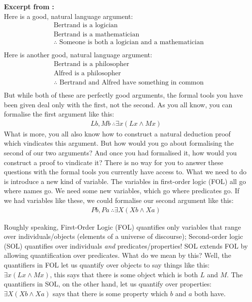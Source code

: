 \begin{tcolorbox}
    \textbf{Excerpt from \cite{truemanSOL}:}\\
    Here is a good, natural language argument:
\begin{align*}
    &\text{Bertrand is a logician}\\
    &\text{Bertrand is a mathematician}\\
    &\therefore \text{ Someone is both a logician and a mathematician}\\
\end{align*}
Here is another good, natural language argument:
\begin{align*}
   &\text{Bertrand is a philosopher}\\
   &\text{Alfred is a philosopher}\\
   &\therefore \text{ Bertrand and Alfred have something in common} \\
\end{align*}
But while both of these are perfectly good arguments, the formal tools you have been given deal only with the first, not the second. As you all know, you can formalise the first argument like this:
\begin{align*}
    Lb, Mb \ \therefore \exists x(Lx\wedge Mx)
\end{align*}
What is more, you all also know how to construct a natural deduction proof which vindicates this argument. But how would you go about formalising the second of our two arguments? And once you had 
formalised it, how would you construct a proof to vindicate it? There is no way for you to answer these questions with the formal tools you currently have access to. What we need to do is introduce 
a new kind of variable. The variables in first-order logic (FOL) all go where names go. We need some new variables, which go where predicates go. If we had variables like these, we could formalise our second
argument like this:
\begin{align*}
    Pb, Pa \ \therefore \exists X(Xb\wedge Xa)
\end{align*}
\end{tcolorbox}

Roughly speaking,  First-Order Logic (FOL) quantifies only variables that range over individuals/objects (elements of a universe of discourse); Second-order logic (SOL) quantifies over individuals \textit{and} predicates/properties! 
SOL extends FOL by allowing quantification over predicates. What do we mean by this? Well, the quantifiers in FOL let us quantify over objects to say things like this: $\exists x(Lx\wedge Mx)$, this says
that there is some object which is both $L$ and $M$. The quantifiers in SOL, on the other hand, let us quantify over properties: $\exists X(Xb\wedge Xa)$ says that there is
some property which $b$ and $a$ both have.

